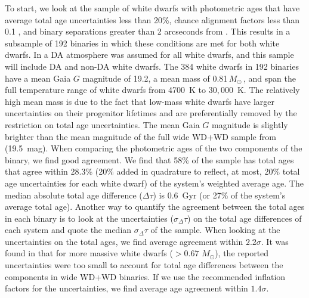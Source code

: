 \documentclass[twocolumn]{aastex631}
\newcommand{\msun}{$M_{\odot}$}
\begin{document}
To start, we look at the sample of white dwarfs with photometric ages that have average total age uncertainties less than 20\%, chance alignment factors less than 0.1 \citep{2021MNRAS.506.2269E}, and binary separations greater than 2 arcseconds from \cite{2022ApJ...934..148H}. This results in a subsample of 192 binaries in which these conditions are met for both white dwarfs. In \cite{2022ApJ...934..148H} a DA atmosphere was assumed for all white dwarfs, and this sample will include DA and non-DA white dwarfs. The 384 white dwarfs in 192 binaries have a mean Gaia $G$ magnitude of 19.2, a mean mass of 0.81\,\msun\,, and span the full temperature range of white dwarfs from 4700~K to $30{,}000$~K. The relatively high mean mass is due to the fact that low-mass white dwarfs have larger uncertainties on their progenitor lifetimes and are preferentially removed by the restriction on total age uncertainties. The mean Gaia $G$ magnitude is slightly brighter than the mean magnitude of the full wide WD+WD sample from \cite{2022ApJ...934..148H} (19.5~mag). When comparing the photometric ages of the two components of the binary, we find good agreement. We find that 58\% of the sample has total ages that agree within 28.3\% (20\% added in quadrature to reflect, at most, 20\% total age uncertainties for each white dwarf) of the system's weighted average age. The median absolute total age difference ($\Delta \tau$) is 0.6~Gyr (or 27\% of the system's average total age). Another way to quantify the agreement between the total ages in each binary is to look at the uncertainties ($\sigma_\Delta\tau$) on the total age differences of each system and quote the median $\sigma_\Delta\tau$ of the sample. When looking at the uncertainties on the total ages, we find average agreement within $2.2\sigma$. It was found in \cite{2022ApJ...934..148H} that for more massive white dwarfs ($>0.67$ \msun), the reported uncertainties were too small to account for total age differences between the components in wide WD+WD binaries. If we use the recommended inflation factors for the uncertainties, we find average age agreement within $1.4\sigma$.
\end{document}
